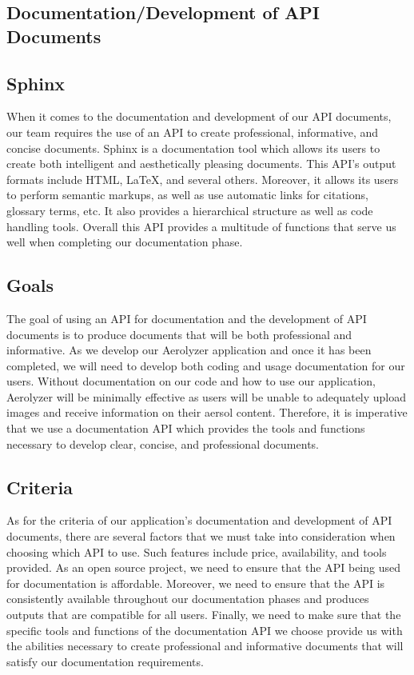 \documentclass[letterpaper,10pt,draftclsnofoot,onecolumn]{IEEEtran}
\begin{document}
\begin{flushleft}
\section{Documentation/Development of API Documents}
\subsection{Sphinx}
When it comes to the documentation and development of our API documents, our team requires the use of an API to create professional, informative, and concise documents. Sphinx is a documentation tool which allows its users to create both intelligent and aesthetically pleasing documents. This API’s output formats include HTML, LaTeX, and several others. Moreover, it allows its users to perform semantic markups, as well as use automatic links for citations, glossary terms, etc. It also provides a hierarchical structure as well as code handling tools. Overall this API provides a multitude of functions that serve us well when completing our documentation phase.
\subsection{Goals}
The goal of using an API for documentation and the development of API documents is to produce documents that will be both professional and informative. As we develop our Aerolyzer application and once it has been completed, we will need to develop both coding and usage documentation for our users. Without documentation on our code and how to use our application, Aerolyzer will be minimally effective as users will be unable to adequately upload images and receive information on their aersol content. Therefore, it is imperative that we use a documentation API which provides the tools and functions necessary to develop clear, concise, and professional documents.
\subsection{Criteria}
As for the criteria of our application’s documentation and development of API documents, there are several factors that we must take into consideration when choosing which API to use. Such features include price, availability, and tools provided. As an open source project, we need to ensure that the API being used for documentation is affordable. Moreover, we need to ensure that the API is consistently available throughout our documentation phases and produces outputs that are compatible for all users. Finally, we need to make sure that the specific tools and functions of the documentation API we choose provide us with the abilities necessary to create professional and informative documents that will satisfy our documentation requirements.

\end{flushleft}
\end{document}
